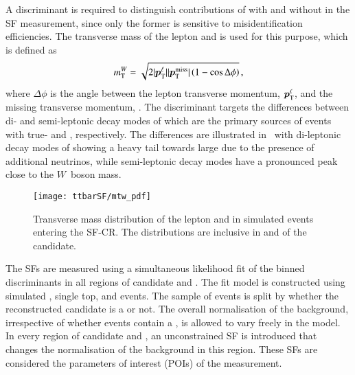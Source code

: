 A discriminant is required to distinguish contributions of \ttbar with and
without \faketauhadvis in the SF measurement, since only the former is sensitive
to \jettotauhadvis misidentification efficiencies. The transverse mass of the
lepton and \pTmissAbs is used for this purpose, which is defined as
\begin{align*}
  m_{\text{T}}^W = \sqrt{2 | \bm{p}_{\text{T}}^{\ell} | | \bm{p}_{\text{T}}^{\text{miss}} | \left( 1 - \cos \Delta\phi \right)} \,\text{,}
\end{align*}
where $\Delta \phi$ is the angle between the lepton transverse momentum,
$\bm{p}_{\text{T}}^{\ell}$, and the missing transverse momentum, \pTmiss. The
\mTW discriminant targets the differences between di- and semi-leptonic decay
modes of \ttbar which are the primary sources of events with true- and
\faketauhadvis, respectively. The differences are illustrated
in~ with di-leptonic decay modes of \ttbar showing a
heavy tail towards large \mTW due to the presence of additional neutrinos, while
semi-leptonic decay modes have a pronounced peak close to the $W$~boson mass.


\begin{figure}[htbp]
  \centering

  \texttt{[image: ttbarSF/mtw\_pdf]}

  \caption{Transverse mass distribution of the lepton and \pTmiss in simulated
    \ttbar events entering the SF-CR. The distributions are inclusive in \pT and
    \Ntracks of the \tauhadvis candidate.}%
  \label{fig:ttbarsf_mtw_pdf}
\end{figure}

The \faketauhadvis SFs are measured using a simultaneous likelihood fit of the
binned \mTW discriminants in all regions of \tauhadvis candidate \pT and
\Ntracks. The fit model is constructed using simulated \ttbar, single top, and
\Vjets events. The sample of \ttbar events is split by whether the
reconstructed \tauhadvis candidate is a \faketauhadvis or not. The overall
normalisation of the \ttbar background, irrespective of whether events contain a
\faketauhadvis, is allowed to vary freely in the model.  In every region of
\tauhadvis candidate \Ntracks and \pT, an unconstrained SF is introduced that
changes the normalisation of the \ttbarFakes background in this region. These
\faketauhadvis SFs are considered the parameters of interest (POIs) of the
measurement.

